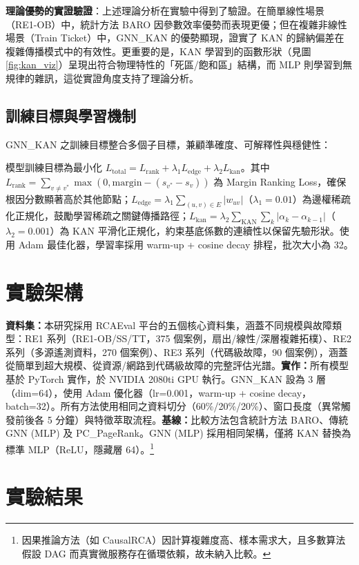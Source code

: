\documentclass[10pt,a4paper,twocolumn]{article}
\begin{document}
\textbf{理論優勢的實證驗證}：上述理論分析在實驗中得到了驗證。在簡單線性場景（RE1-OB）中，統計方法 BARO 因參數效率優勢而表現更優；但在複雜非線性場景（Train Ticket）中，GNN\_KAN 的優勢顯現，證實了 KAN 的歸納偏差在複雜傳播模式中的有效性。更重要的是，KAN 學習到的函數形狀（見圖 \ref{fig:kan_viz}）呈現出符合物理特性的「死區/飽和區」結構，而 MLP 則學習到無規律的雜訊，這從實證角度支持了理論分析。

\subsection{訓練目標與學習機制}

GNN\_KAN 之訓練目標整合多個子目標，兼顧準確度、可解釋性與穩健性：

模型訓練目標為最小化 $L_{\text{total}} = L_{\text{rank}} + \lambda_1 L_{\text{edge}} + \lambda_2 L_{\text{kan}}$。其中 $L_{\text{rank}} = \sum_{v \neq v^*} \max(0, \text{margin} - (s_{v^*} - s_v))$ 為 Margin Ranking Loss，確保根因分數顯著高於其他節點；$L_{\text{edge}} = \lambda_1 \sum_{(u,v)\in E} |w_{uv}|$（$\lambda_1=0.01$）為邊權稀疏化正規化，鼓勵學習稀疏之關鍵傳播路徑；$L_{\text{kan}} = \lambda_2 \sum_{\text{KAN}} \sum_k |\alpha_k - \alpha_{k-1}|$（$\lambda_2=0.001$）為 KAN 平滑化正規化，約束基底係數的連續性以保留先驗形狀。使用 Adam 最佳化器，學習率採用 warm-up + cosine decay 排程，批次大小為 32。

\section{實驗架構}

\textbf{資料集：}本研究採用 RCAEval 平台的五個核心資料集，涵蓋不同規模與故障類型：RE1 系列（RE1-OB/SS/TT，375 個案例，扇出/線性/深層複雜拓樸）、RE2 系列（多源遙測資料，270 個案例）、RE3 系列（代碼級故障，90 個案例），涵蓋從簡單到超大規模、從資源/網路到代碼級故障的完整評估光譜。\textbf{實作：}所有模型基於 PyTorch 實作，於 NVIDIA 2080ti GPU 執行。GNN\_KAN 設為 3 層（dim=64），使用 Adam 優化器（lr=0.001，warm-up + cosine decay，batch=32）。所有方法使用相同之資料切分（60\%/20\%/20\%）、窗口長度（異常觸發前後各 5 分鐘）與特徵萃取流程。\textbf{基線：}比較方法包含統計方法 BARO、傳統 GNN (MLP) 及 PC\_PageRank。GNN (MLP) 採用相同架構，僅將 KAN 替換為標準 MLP（ReLU，隱藏層 64）。\footnote{因果推論方法（如 CausalRCA）因計算複雜度高、樣本需求大，且多數算法假設 DAG 而真實微服務存在循環依賴，故未納入比較。}

\section{實驗結果}
\end{document}

